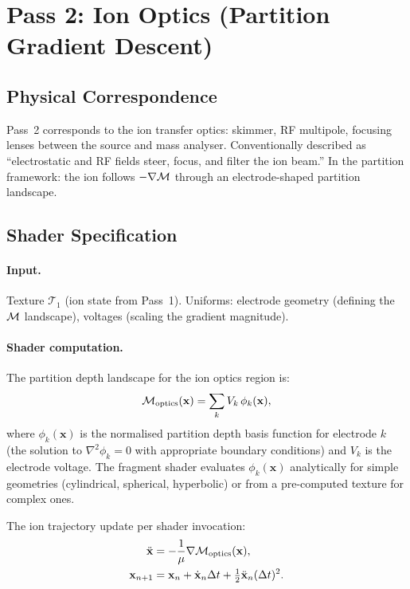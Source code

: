 \section{Pass 2: Ion Optics (Partition Gradient Descent)}
\label{sec:ch22-pass2}

\subsection{Physical Correspondence}

Pass~2 corresponds to the ion transfer optics: skimmer, RF multipole,
focusing lenses between the source and mass analyser.  Conventionally described
as ``electrostatic and RF fields steer, focus, and filter the ion beam.''
In the partition framework: the ion follows $-\nabla\mathcal{M}$ through an
electrode-shaped partition landscape.

\subsection{Shader Specification}

\paragraph{Input.}
Texture $\mathcal{T}_1$ (ion state from Pass~1).  Uniforms: electrode geometry
(defining the $\mathcal{M}$ landscape), voltages (scaling the gradient magnitude).

\paragraph{Shader computation.}

The partition depth landscape for the ion optics region is:
\begin{equation}
  \mathcal{M}_{\mathrm{optics}}(\mathbf{x}) = \sum_k V_k\,\phi_k(\mathbf{x}),
\end{equation}
where $\phi_k(\mathbf{x})$ is the normalised partition depth basis function
for electrode $k$ (the solution to $\nabla^2\phi_k = 0$ with appropriate
boundary conditions) and $V_k$ is the electrode voltage.  The fragment
shader evaluates $\phi_k(\mathbf{x})$ analytically for simple geometries
(cylindrical, spherical, hyperbolic) or from a pre-computed texture for
complex ones.

The ion trajectory update per shader invocation:
\begin{align}
  \ddot{\mathbf{x}} &= -\frac{1}{\mu}\nabla\mathcal{M}_{\mathrm{optics}}(\mathbf{x}), \\
  \mathbf{x}_{n+1} &= \mathbf{x}_n + \dot{\mathbf{x}}_n\Delta t
    + \tfrac{1}{2}\ddot{\mathbf{x}}_n(\Delta t)^2.
\end{align}

